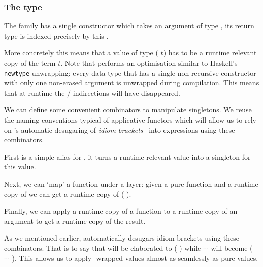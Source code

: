 
\subsubsection{The  type}\label{sec:datasingleton}

The  family has a single constructor
which takes an argument  of type ,
its return type is indexed precisely by this .


More concretely this means that a value of type
( $t$) has to be a runtime relevant
copy of the term $t$.
%
Note that \idris{} performs an optimisation similar to Haskell's
\texttt{newtype} unwrapping: every data type that has a single
non-recursive constructor with only one non-erased argument
is unwrapped during compilation.
%
This means that at runtime the
 /  indirections
will have disappeared.

We can define some convenient combinators to manipulate
singletons.
%
We reuse the naming conventions typical of applicative
functors which will allow us to rely on \idris{}'s automatic
desugaring of \emph{idiom brackets}~\cite{DBLP:journals/jfp/McbrideP08}
into expressions using these combinators.


First  is a simple alias for ,
it turns a runtime-relevant value  into a singleton for
this value.


Next, we can `map' a function under a  layer: given
a pure function  and a runtime copy of  we
can get a runtime copy of ( ).


Finally, we can apply a runtime copy of a function to a runtime copy of
an argument to get a runtime copy of the result.

As we mentioned earlier, \idris{} automatically desugars idiom brackets
using these combinators. That is to say that
\IdrisKeyword{[|}  \IdrisKeyword{|]} will be elaborated to
( ) while
\IdrisKeyword{[|}   $\cdots$  \IdrisKeyword{|]}
will become
( \IdrisFunction{<\$>}  \IdrisFunction{<*>} $\cdots$ \IdrisFunction{<*>} ).
%
This allows us to apply -wrapped values almost as seamlessly as pure values.
